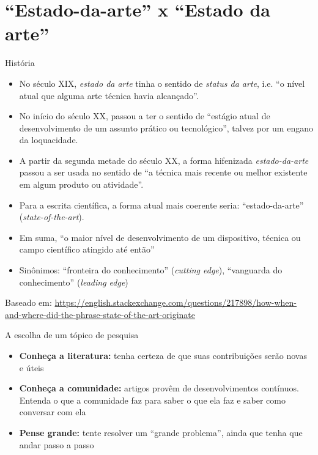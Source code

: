 
\section{``Estado-da-arte'' x ``Estado da arte''}

\begin{frame}{História}
\begin{itemize}
\item No século XIX, \emph{estado da arte} tinha o sentido de \emph{status da arte}, i.e. ``o nível atual que alguma arte técnica havia alcançado''.
\item No início do século XX, passou a ter o sentido de ``estágio atual de desenvolvimento de um assunto prático ou tecnológico'', talvez por um engano da loquacidade.
\item A partir da segunda metade do século XX, a forma hifenizada \emph{estado-da-arte} passou a ser usada no sentido de ``a técnica mais recente ou melhor existente em algum produto ou atividade''.
\end{itemize}
\end{frame}

\begin{frame}
\begin{itemize}
\item Para a escrita científica, a forma atual mais coerente seria: ``estado-da-arte'' (\emph{state-of-the-art}).
\item Em suma, ``o maior nível de desenvolvimento de um dispositivo, técnica ou campo científico atingido até então''
\item Sinônimos: ``fronteira do conhecimento'' (\emph{cutting edge}), ``vanguarda do conhecimento'' (\emph{leading edge})
\end{itemize}
Baseado em: \scriptsize{\url{https://english.stackexchange.com/questions/217898/how-when-and-where-did-the-phrase-state-of-the-art-originate}}
\end{frame}

\begin{frame}{A escolha de um tópico de pesquisa}
\begin{itemize}
\item \textbf{Conheça a literatura:} tenha certeza de que suas contribuições serão novas e úteis
\item \textbf{Conheça a comunidade:} artigos provêm de desenvolvimentos contínuos. Entenda o que a comunidade faz para saber o que ela faz e saber como conversar com ela
\item \textbf{Pense grande:} tente resolver um ``grande problema'', ainda que tenha que andar passo a passo
\end{itemize}
\end{frame}

